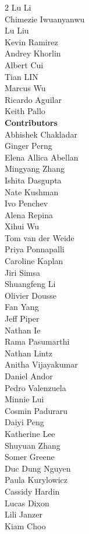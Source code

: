 \begin{multicols}{2}
Lu Li  \\
Chimezie Iwuanyanwu  \\
Lu Liu  \\
Kevin Ramirez  \\
Andrey Khorlin  \\
Albert Cui  \\
Tian LIN  \\
Marcus Wu \\
Ricardo Aguilar \\
Keith Pallo  \\
\textbf{Contributors} \\
Abhishek Chakladar \\
Ginger Perng \\
Elena Allica Abellan \\
Mingyang Zhang \\
Ishita Dasgupta \\
Nate Kushman \\
Ivo Penchev \\
Alena Repina  \\
Xihui Wu  \\
Tom van der Weide  \\
Priya Ponnapalli \\
Caroline Kaplan  \\
Jiri Simsa  \\
Shuangfeng Li  \\
Olivier Dousse  \\
Fan Yang  \\
Jeff Piper  \\
Nathan Ie  \\
Rama Pasumarthi \\
Nathan Lintz \\
Anitha Vijayakumar \\
Daniel Andor \\
Pedro Valenzuela \\
Minnie Lui  \\
Cosmin Paduraru \\
Daiyi Peng \\
Katherine Lee \\
Shuyuan Zhang \\
Somer Greene \\
Duc Dung Nguyen \\
Paula Kurylowicz \\
Cassidy Hardin \\
Lucas Dixon \\
Lili Janzer \\
Kiam Choo \\

\end{multicols}
